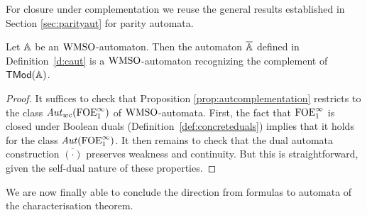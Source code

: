 For closure under complementation we reuse the general results established in 
Section \ref{sec:parityaut} for parity automata.

\begin{lemma}
\label{t:cl-cmp}
Let $\mathbb{A}$ be an $\mathrm{WMSO}$-automaton.
Then the automaton $\overline{\mathbb{A}}$ defined in Definition~\ref{d:caut} is a
$\mathrm{WMSO}$-automaton recognizing the complement of $\mathsf{TMod}(\mathbb{A})$.
\end{lemma}

\begin{proof} 
It suffices to check that Proposition \ref{prop:autcomplementation} restricts 
to the class $\mathit{Aut}_{wc}(\mathrm{FOE}^{\infty}_1)$ of $\mathrm{WMSO}$-automata. 
First, the fact that $\mathrm{FOE}^{\infty}_1$ is closed under Boolean duals 
(Definition~\ref{def:concreteduals}) implies that it holds for the class
$\mathit{Aut}(\mathrm{FOE}^{\infty}_1)$. 
It then remains to check that the dual automata construction 
$\overline{(\cdot)}$ preserves weakness and continuity. 
But this is straightforward, given the self-dual nature of these properties.
\end{proof}



We are now finally able to conclude the direction from formulas to automata of 
the characterisation theorem.

